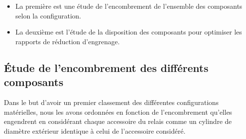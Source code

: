 \documentclass{config}
\begin{document}
\begin{spacing}{1.2}
\begin{itemize}
 \item La première est une étude de l'encombrement de l'ensemble des composants selon la configuration.
 \item La deuxième est l'étude de la disposition des composants pour optimiser les rapports de réduction d'engrenage.
\end{itemize}

\newpage
\subsection{Étude de l'encombrement des différents composants}
Dans le but d'avoir un premier classement des différentes configurations matérielles, nous les avons ordonnées en fonction de l'encombrement qu'elles engendrent en considérant chaque accessoire du relais comme un cylindre de diamètre extérieur identique à celui de l'accessoire considéré. 


\end{spacing}
\end{document}
